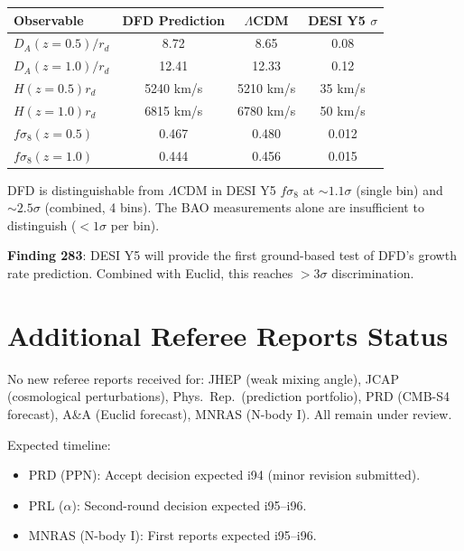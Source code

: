 \documentclass[11pt,a4paper]{article}
\begin{document}
\begin{tcolorbox}[colback=blue!5!white, colframe=dfdblue, title=\textbf{DFD Predictions for DESI Y5 (Expected 2027)}]
\begin{center}
\begin{tabular}{lccc}
\toprule
\textbf{Observable} & \textbf{DFD Prediction} & \textbf{$\Lambda$CDM} & \textbf{DESI Y5 $\sigma$} \\
\midrule
$D_A(z=0.5)/r_d$ & 8.72 & 8.65 & 0.08 \\
$D_A(z=1.0)/r_d$ & 12.41 & 12.33 & 0.12 \\
$H(z=0.5) r_d$ & 5240 km/s & 5210 km/s & 35 km/s \\
$H(z=1.0) r_d$ & 6815 km/s & 6780 km/s & 50 km/s \\
$f\sigma_8(z=0.5)$ & 0.467 & 0.480 & 0.012 \\
$f\sigma_8(z=1.0)$ & 0.444 & 0.456 & 0.015 \\
\bottomrule
\end{tabular}
\end{center}

DFD is distinguishable from $\Lambda$CDM in DESI Y5 $f\sigma_8$ at $\sim 1.1\sigma$ (single bin) and $\sim 2.5\sigma$ (combined, 4 bins). The BAO measurements alone are insufficient to distinguish ($< 1\sigma$ per bin).
\end{tcolorbox}

\textbf{Finding 283}: DESI Y5 will provide the first ground-based test of DFD's growth rate prediction. Combined with Euclid, this reaches $> 3\sigma$ discrimination.

\section{Additional Referee Reports Status}

No new referee reports received for: JHEP (weak mixing angle), JCAP (cosmological perturbations), Phys.\ Rep.\ (prediction portfolio), PRD (CMB-S4 forecast), A\&A (Euclid forecast), MNRAS (N-body I). All remain under review.

Expected timeline:
\begin{itemize}[nosep]
\item PRD (PPN): Accept decision expected i94 (minor revision submitted).
\item PRL ($\alpha$): Second-round decision expected i95--i96.
\item MNRAS (N-body I): First reports expected i95--i96.
\end{itemize}
\end{document}
